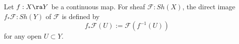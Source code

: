 %


\begin{definition}
    Let $f : X \ra Y$ be a continuous map.
    For sheaf $\mathscr{F} : Sh (X)$,
    the direct image $f_* \mathscr{F} : Sh (Y)$
    of $\mathscr{F}$
    is defined by
    \begin{equation}
        f_* \mathscr{F} (U) := \mathscr{F} (f^{-1} (U))
    \end{equation}
    for any open $U \subset Y$.
\end{definition}

\begin{definition}
    
\end{definition}

\begin{theorem}
    
\end{theorem}